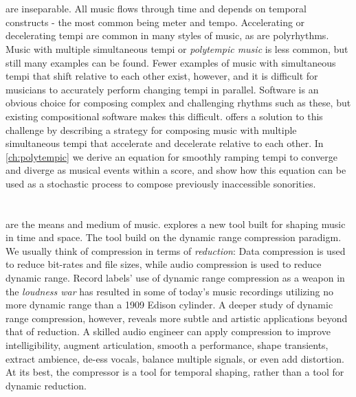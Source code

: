 \section{\polytempic}
\label{sec:polytempic-intro}
 are inseparable. All music flows through
time and depends on temporal constructs - the most common being meter
and tempo. Accelerating or decelerating tempi are common in many
styles of music, as are polyrhythms.  Music with multiple simultaneous
tempi or \textit{polytempic music} is less common, but still many
examples can be found. Fewer examples of music with simultaneous tempi
that shift relative to each other exist, however, and it is difficult
for musicians to accurately perform changing tempi in
parallel. Software is an obvious choice for composing complex and
challenging rhythms such as these, but existing compositional software
makes this difficult. \polytempic offers a solution to this challenge
by describing a strategy for composing music with multiple
simultaneous tempi that accelerate and decelerate relative to each
other. In \autoref{ch:polytempic} we derive an equation for smoothly
ramping tempi to converge and diverge as musical events within a
score, and show how this equation can be used as a stochastic process
to compose previously inaccessible sonorities.

\section{\thesis}
\label{sec:hypercompression-intro}
 are the means and medium of music. \thesis
explores a new tool built for shaping music in time and space. The
tool build on the dynamic range compression paradigm.  We usually
think of compression in terms of \emph{reduction}: Data compression is
used to reduce bit-rates and file sizes, while audio compression is
used to reduce dynamic range. Record labels' use of dynamic range
compression as a weapon in the \emph{loudness
  war}\cite{Deruty2014a} has resulted in some of today's music
recordings utilizing no more dynamic range than a 1909 Edison
cylinder.\cite{Katz2007} A deeper study of dynamic range compression,
however, reveals more subtle and artistic applications beyond that of
reduction. A skilled audio engineer can apply compression to improve
intelligibility, augment articulation, smooth a performance, shape
transients, extract ambience, de-ess vocals, balance multiple signals,
or even add distortion.\cite{Case2007} At its best, the compressor is
a tool for temporal shaping, rather than a tool for dynamic reduction.

